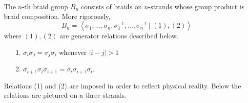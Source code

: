\begin{definition}
    The $n$-th braid group $B_n$ consists of braids on $n$-strands whose 
    group product is braid composition. More rigorously, 
    \[
        B_n = 
        \left< \sigma_1, \dots, \sigma_n, \sigma_1^{-1}, \dots, \sigma_n^{-1} \mid (1), (2)\right>
    \]
    where $(1), (2)$ are generator relations described below. 
    \begin{itemize}
        \item[1.] $\sigma_i\sigma_j = \sigma_j\sigma_i$ whenever $|i - j|>1$
        \item[2.] $\sigma_{i+1}\sigma_i\sigma_{i+1} = \sigma_{i}\sigma_{i+1}\sigma_i$.
    \end{itemize}
\end{definition}
Relations (1) and (2) are imposed in order to reflect physical reality.
Below the relations are pictured on a three strands.
